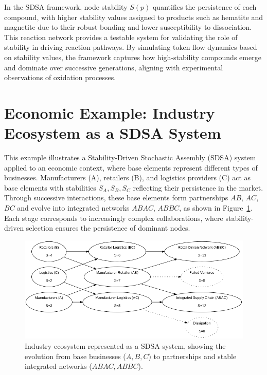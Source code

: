 \documentclass[preprint,12pt]{elsarticle}
\begin{document}
In the SDSA framework, node stability \(S(p)\) quantifies the persistence of each compound, with higher stability values assigned to products such as hematite and magnetite due to their robust bonding and lower susceptibility to dissociation. This reaction network provides a testable system for validating the role of stability in driving reaction pathways. By simulating token flow dynamics based on stability values, the framework captures how high-stability compounds emerge and dominate over successive generations, aligning with experimental observations of oxidation processes.




\section{Economic Example: Industry Ecosystem as a SDSA System}

This example illustrates a Stability-Driven Stochastic Assembly (SDSA) system applied to an economic context, where base elements represent different types of businesses. Manufacturers (A), retailers (B), and logistics providers (C) act as base elements with stabilities \( S_A, S_B, S_C \) reflecting their persistence in the market. Through successive interactions, these base elements form partnerships \( AB \), \( AC \), \( BC \) and evolve into integrated networks \( ABAC \), \( ABBC \), as shown in Figure~\ref{fig:figure_9}. Each stage corresponds to increasingly complex collaborations, where stability-driven selection ensures the persistence of dominant nodes. 

\begin{figure}[h]
    \centering
    \includegraphics[width=1\textwidth]{figure_9.png}
    \caption{Industry ecosystem represented as a SDSA system, showing the evolution from base businesses (\( A, B, C \)) to partnerships and stable integrated networks (\( ABAC, ABBC \)).}
    \label{fig:figure_9}
\end{figure}
\end{document}
